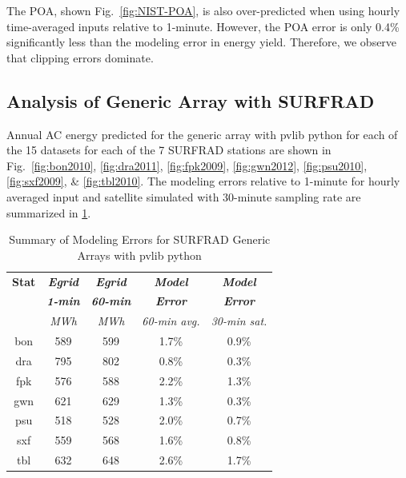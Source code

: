 \documentclass[conference]{IEEEtran}
\begin{document}
The POA, shown Fig.~\ref{fig:NIST-POA}, is also over-predicted when using hourly time-averaged inputs relative to 1-minute. However, the POA error is only 0.4\% significantly less than the modeling error in energy yield. Therefore, we observe that clipping errors dominate.

\subsection{Analysis of Generic Array with SURFRAD}
Annual AC energy predicted for the generic array with pvlib python for each of the 15 datasets for each of the 7 SURFRAD stations are shown in Fig.~\ref{fig:bon2010}, \ref{fig:dra2011}, \ref{fig:fpk2009}, \ref{fig:gwn2012}, \ref{fig:psu2010}, \ref{fig:sxf2009}, \& \ref{fig:tbl2010}. The modeling errors relative to 1-minute for hourly averaged input and satellite simulated with 30-minute sampling rate are summarized in \ref{table:SURFRAD-summary}.

\begin{table}[htbp]
\caption{Summary of Modeling Errors for SURFRAD Generic Arrays with pvlib python}
\begin{center}
\begin{tabular}{|c|c|c|c|c|}
\hline
\textbf{Stat} & \textbf{\textit{Egrid}}& \textbf{\textit{Egrid}}& \textbf{\textit{Model}}& \textbf{\textit{Model}} \\
              & \textbf{\textit{1-min}}& \textbf{\textit{60-min}}& \textbf{\textit{Error}}& \textbf{\textit{Error}} \\
                 & \textit{MWh}& \textit{MWh}& \textit{60-min avg.}& \textit{30-min sat.} \\
\hline
bon& 589& 599& 1.7\%& 0.9\% \\
dra& 795& 802& 0.8\%& 0.3\% \\
fpk& 576& 588& 2.2\%& 1.3\% \\
gwn& 621& 629& 1.3\%& 0.3\% \\
psu& 518& 528& 2.0\%& 0.7\% \\
sxf& 559& 568& 1.6\%& 0.8\% \\
tbl& 632& 648& 2.6\%& 1.7\% \\
\hline
\end{tabular}
\label{table:SURFRAD-summary}
\end{center}
\end{table}
\end{document}

